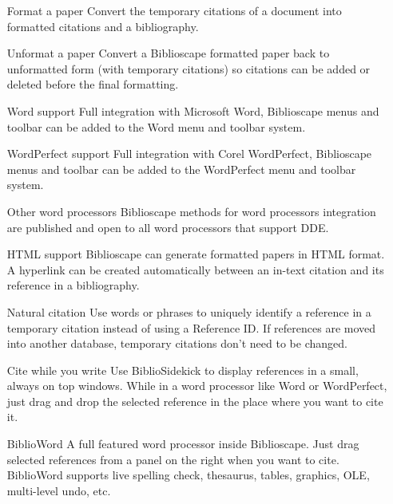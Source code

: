 \begin{itemize}
\item  [Format a paper] Convert the temporary citations of a document
 into formatted citations and a bibliography.

 \item[Unformat a paper] Convert a Biblioscape formatted paper back to
 unformatted form (with temporary citations) so citations can be
 added or deleted before the final formatting.

 \item[Word support] Full integration with Microsoft Word, Biblioscape
 menus and toolbar can be added to the Word menu and toolbar
 system.

 \item[WordPerfect support] Full integration with Corel WordPerfect,
 Biblioscape menus and toolbar can be added to the WordPerfect
 menu and toolbar system.

 \item[Other word processors] Biblioscape methods for word processors
 integration are published and open to all word processors that
 support DDE.

 \item[HTML support] Biblioscape can generate formatted papers in HTML
 format. A hyperlink can be created automatically between an
 in-text citation and its reference in a bibliography.

 \item[Natural citation] Use words or phrases to uniquely identify a
 reference in a temporary citation instead of using a Reference ID.
 If references are moved into another database, temporary citations
 don't need to be changed.

 \item[Cite while you write] Use BiblioSidekick to display references in a
  small, always on top windows. While in a word processor like Word
 or WordPerfect, just drag and drop the selected reference in the
 place where you want to cite it.

 \item[BiblioWord] A full featured word processor inside Biblioscape. Just
 drag selected references from a panel on the right when you want
 to cite. BiblioWord supports live spelling check, thesaurus, tables,
 graphics, OLE, multi-level undo, etc.

\end{itemize}

